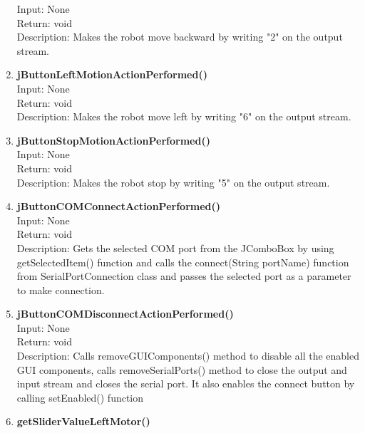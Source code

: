 \documentclass{article}
\begin{document}
\begin{enumerate}
		Input: None\\
		Return: void\\
		Description: Makes the robot move backward by writing "2" on the output stream. \vspace{0.5cm} \\
		\item \textbf{jButtonLeftMotionActionPerformed()} \vspace{0.25cm} \\
		Input: None\\
		Return: void\\
		Description: Makes the robot move left by writing "6" on the output stream. \vspace{0.5cm} \\
		\item \textbf{jButtonStopMotionActionPerformed()} \vspace{0.25cm} \\
		Input: None\\
		Return: void\\
		Description: Makes the robot stop by writing "5" on the output stream. \vspace{0.5cm} \\
		\item \textbf{jButtonCOMConnectActionPerformed()} \vspace{0.25cm} \\
		Input: None\\
		Return: void\\
		Description: Gets the selected COM port from the JComboBox by using getSelectedItem() function and calls the connect(String portName) function from SerialPortConnection class and passes the selected port as a parameter to make connection. \vspace{0.5cm} \\
		\item \textbf{jButtonCOMDisconnectActionPerformed()} \vspace{0.25cm} \\
		Input: None \\
		Return: void\\
		Description: Calls removeGUIComponents() method to disable all the enabled GUI components, calls removeSerialPorts() method to close the output and input stream and closes the serial port. It also enables the connect button by calling setEnabled() function \vspace{0.5cm} \\
		\item \textbf{getSliderValueLeftMotor()} \vspace{0.25cm} \\

\end{enumerate}
\end{document}
